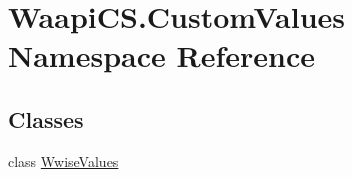 \hypertarget{namespace_waapi_c_s_1_1_custom_values}{}\section{Waapi\+C\+S.\+Custom\+Values Namespace Reference}
\label{namespace_waapi_c_s_1_1_custom_values}
\subsection*{Classes}
\begin{DoxyCompactItemize}
\item 
class \mbox{\hyperlink{class_waapi_c_s_1_1_custom_values_1_1_wwise_values}{Wwise\+Values}}
\end{DoxyCompactItemize}
